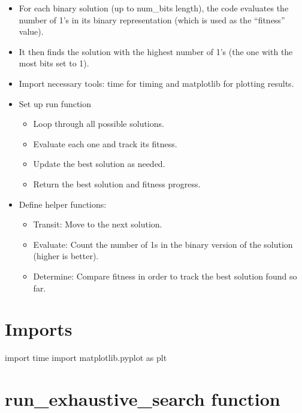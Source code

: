 \documentclass[
  letterpaper,
  DIV=11,
  numbers=noendperiod]{scrreprt}
\newenvironment{Shaded}{\begin{snugshade}}{\end{snugshade}}
\newcommand{\ImportTok}[1]{\textcolor[rgb]{0.00,0.46,0.62}{#1}}
\newcommand{\NormalTok}[1]{\textcolor[rgb]{0.00,0.23,0.31}{#1}}
\providecommand{\tightlist}{%
  \setlength{\itemsep}{0pt}\setlength{\parskip}{0pt}}\usepackage{longtable,booktabs,array}
\begin{document}
\begin{itemize}
\item
  For each binary solution (up to num\_bits length), the code evaluates
  the number of 1's in its binary representation (which is used as the
  ``fitness'' value).
\item
  It then finds the solution with the highest number of 1's (the one
  with the most bits set to 1).
\item
  Import necessary tools: time for timing and matplotlib for plotting
  results.
\item
  Set up run function

  \begin{itemize}
  \tightlist
  \item
    Loop through all possible solutions.
  \item
    Evaluate each one and track its fitness.
  \item
    Update the best solution as needed.
  \item
    Return the best solution and fitness progress.
  \end{itemize}
\item
  Define helper functions:

  \begin{itemize}
  \tightlist
  \item
    Transit: Move to the next solution.
  \item
    Evaluate: Count the number of 1s in the binary version of the
    solution (higher is better).
  \item
    Determine: Compare fitness in order to track the best solution found
    so far.
  \end{itemize}
\end{itemize}

\section{Imports}\label{imports}

\begin{Shaded}
\begin{Highlighting}[]
\ImportTok{import}\NormalTok{ time}
\ImportTok{import}\NormalTok{ matplotlib.pyplot }\ImportTok{as}\NormalTok{ plt}
\end{Highlighting}
\end{Shaded}

\section{run\_exhaustive\_search
function}\label{run_exhaustive_search-function}
\end{document}
